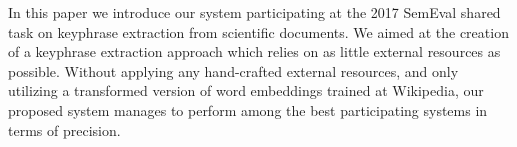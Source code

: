 In this paper we introduce our system participating at the 2017 SemEval shared task on keyphrase extraction from scientific documents. We aimed at the creation of a keyphrase extraction approach which relies on as little external resources as possible. Without applying any hand-crafted external resources, and only utilizing a transformed version of word embeddings trained at Wikipedia, our proposed system manages to perform among the best participating systems in terms of precision.
